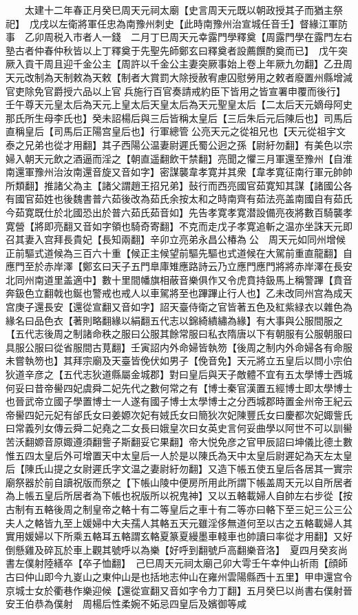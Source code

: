 　　太建十二年春正月癸巳周天元祠太廟【史言周天元既以朝政授其子而猶主祭祀】　戊戌以左衛將軍任忠為南豫州刺史【此時南豫州治宣城任音壬】督緣江軍防事　乙卯周税入市者人一錢　二月丁巳周天元幸露門學釋奠【周露門學在露門左右塾古者仲春仲秋皆以上丁釋奠于先聖先師鄭玄曰釋奠者設薦饌酌奠而已】　戊午突厥入貢干周且迎千金公主【周許以千金公主妻突厥事始上卷上年厥九勿翻】乙丑周天元改制為天制敕為天敕【制者大賞罰大除授赦宥慮囚慰勞用之敕者廢置州縣增減官吏除免官爵授六品以上官兵施行百官奏請戒約臣下皆用之皆宣署申覆而後行】壬午尊天元皇太后為天元上皇太后天皇太后為天元聖皇太后【二太后天元嫡母阿史那氏所生母李氏也】癸未詔楊后與三后皆稱太皇后【三后朱后元后陳后也】司馬后直稱皇后【司馬后正陽宫皇后也】行軍總管公亮天元之從祖兄也【天元從祖宇文泰之兄弟也從才用翻】其子西陽公温妻尉遲氏蜀公迥之孫【尉紆勿翻】有美色以宗婦入朝天元飲之酒逼而淫之【朝直遥翻飲干禁翻】亮聞之懼三月軍還至豫州【自淮南還軍豫州治汝南還音旋又音如字】密謀襲韋孝寛并其衆【韋孝寛征南行軍元帥帥所類翻】推諸父為主【諸父謂趙王招兄弟】鼔行而西亮國官茹寛知其謀【諸國公各有國官茹姓也後魏書普六茹後改為茹氏余按太和之時南齊有茹法亮盖南國自有茹氏今茹寛既仕於北國恐出於普六茹氏茹音如】先告孝寛孝寛潜設備亮夜將數百騎襲孝寛營【將即亮翻又音如字領也騎奇寄翻】不克而走戊子孝寛追斬之温亦坐誅天元即召其妻入宫拜長貴妃【長知兩翻】辛卯立亮弟永昌公椿為公　周天元如同州增候正前驅式道候為三百六十重【候正主候望前驅先驅也式道候在大駕前重直龍翻】自應門至於赤岸澤【鄭玄曰天子五門臯庫雉應路詩云乃立應門應門將將赤岸澤在長安北同州南道里盖適中】數十里間幡旗相蔽音樂俱作又令虎賁持鈒馬上稱警蹕【賁音奔鈒色立翻戟也鋋也警戒也戒人以車駕將至也蹕蹕止行人也】乙未改同州宫為成天宫庚子還長安【還從宣翻又音如字】詔天臺侍衛之官皆著五色及紅紫緑衣以雜色為緣名曰品色衣【著則略翻緣以絹翻五代志以錦綺繢繡為緣】有大事與公服間服之【五代志後周之制諸命秩之服曰公服其餘常服曰私衣隋唐以下有朝服有公服朝服曰具服公服曰從省服間古莧翻】壬寅詔内外命婦皆執笏【後周之制内外命婦各有命服未嘗執笏也】其拜宗廟及天臺皆俛伏如男子【俛音免】天元將立五皇后以問小宗伯狄道辛彦之【五代志狄道縣屬金城郡】對曰皇后與天子敵體不宜有五太學博士西城何妥曰昔帝嚳四妃虞舜二妃先代之數何常之有【博士秦官漢置五經博士即太學博士也晉武帝立國子學置博士一人遂有國子博士太學博士之分西城郡時置金州帝王紀云帝嚳四妃元妃有邰氏女曰姜嫄次妃有娀氏女曰簡狄次妃陳豐氏女曰慶都次妃娵訾氏曰常義列女傳云舜二妃堯之二女長曰娥皇次曰女英史言何妥曲學以阿世不可以訓嚳苦沃翻嫄音原娵遵須翻訾子斯翻妥它果翻】帝大悦免彦之官甲辰詔曰坤儀比德土數惟五四太皇后外可增置天中太皇后一人於是以陳氏為天中太皇后尉遲妃為天左太皇后【陳氏山提之女尉遲氏字文温之妻尉紆勿翻】又造下帳五使五皇后各居其一實宗廟祭器於前自讀祝版而祭之【下帳山陵中便房所用此所謂下帳盖周天元以自所居者為上帳五皇后所居者為下帳也祝版所以祝鬼神】又以五輅載婦人自帥左右步從【按古制有五輅後周之制皇帝之輅十有二等皇后之車十有二等亦曰輅下至三妃三公三公夫人之輅皆九至上媛婦中大夫孺人其輅五天元雖淫侈無道何至以古之五輅載婦人其實用媛婦以下所乘五輅耳五輅謂玄輅夏篆夏縵墨車輚車也帥讀曰率從才用翻】又好倒懸雞及碎瓦於車上觀其號呼以為樂【好呼到翻號戶高翻樂音洛】　夏四月癸亥尚書左僕射陸繕卒【卒子恤翻】　己巳周天元祠太廟己卯大雩壬午幸仲山祈雨【顔師古曰仲山即今九嵏山之東仲山是也括地志仲山在雍州雲陽縣西十五里】甲申還宫令京城士女於衢巷作樂迎候【還從宣翻又音如字令力丁翻】五月癸巳以尚書右僕射晉安王伯恭為僕射　周楊后性柔婉不妬忌四皇后及嬪御等咸
